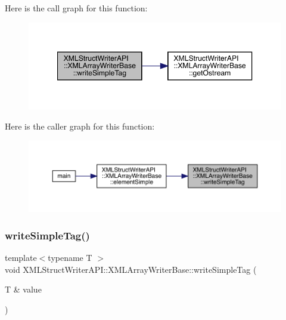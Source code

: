 Here is the call graph for this function\+:
\nopagebreak
\begin{figure}[H]
\begin{center}
\leavevmode
\includegraphics[width=347pt]{d5/d41/classXMLStructWriterAPI_1_1XMLArrayWriterBase_a7c0092991561b5000ae55724cdc3d062_cgraph}
\end{center}
\end{figure}
Here is the caller graph for this function\+:\nopagebreak
\begin{figure}[H]
\begin{center}
\leavevmode
\includegraphics[width=350pt]{d5/d41/classXMLStructWriterAPI_1_1XMLArrayWriterBase_a7c0092991561b5000ae55724cdc3d062_icgraph}
\end{center}
\end{figure}
\mbox{\label{classXMLStructWriterAPI_1_1XMLArrayWriterBase_a7c0092991561b5000ae55724cdc3d062}} 
\subsubsection{\texorpdfstring{writeSimpleTag()}{writeSimpleTag()}\hspace{0.1cm}{\footnotesize\ttfamily [2/2]}}
{\footnotesize\ttfamily template$<$typename T $>$ \\
void X\+M\+L\+Struct\+Writer\+A\+P\+I\+::\+X\+M\+L\+Array\+Writer\+Base\+::write\+Simple\+Tag (\begin{DoxyParamCaption}\item[{T \&}]{value }\end{DoxyParamCaption})\hspace{0.3cm}{\ttfamily [inline]}}

